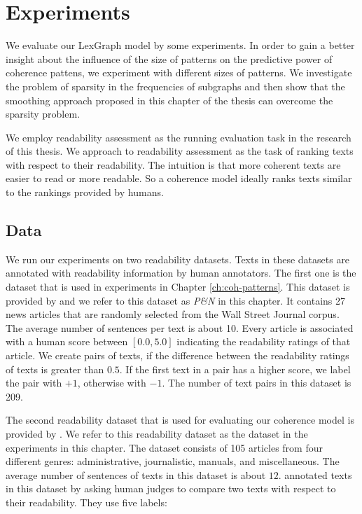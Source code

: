 \section{Experiments}
\label{sec:lex-graph-results}

We evaluate our LexGraph model by some experiments.  
In order to gain a better insight about the influence of the size of patterns on the predictive power of coherence pattens, we experiment with different sizes of patterns. 
We investigate the problem of sparsity in the frequencies of subgraphs and then show that the smoothing approach proposed in this chapter of the thesis can overcome the sparsity problem. 

We employ readability assessment as the running evaluation task in the research of this thesis.
We approach to readability assessment as the task of ranking texts with respect to their readability. 
The intuition is that more coherent texts are easier to
read or more readable. 
So a coherence model ideally ranks texts similar to the rankings provided by humans.  

\subsection{Data}
We run our experiments on two readability datasets. 
Texts in these datasets are annotated with readability information by human annotators.
The first one is the dataset that is used in experiments in Chapter \ref{ch:coh-patterns}. 
This dataset is provided by  and we refer to this dataset as \emph{P\&N} in this chapter.  
It contains 27 news articles that are randomly selected from
the Wall Street Journal corpus. 
The average number of sentences per text is about 10.   
Every article is associated with a human score between $[0.0,5.0]$ indicating the readability ratings of that article. 
We create pairs of texts, if the difference between the readability ratings of texts is greater than $0.5$. 
If the first text in a pair has a higher score, we label
the pair with $+1$, otherwise with $-1$. 
The number of text pairs in this dataset is 209.

The second readability dataset that is used for evaluating our coherence model is provided by .  
We refer to this readability dataset as the \declercqds dataset in the experiments in this chapter.  
The \declercqds dataset consists of 105 articles from four different genres: administrative, journalistic, manuals, and miscellaneous. 
The average number of sentences of texts in this dataset is about $12$. 
 annotated texts in this dataset by asking human judges to compare two texts with respect to their readability. 
They use five labels:

